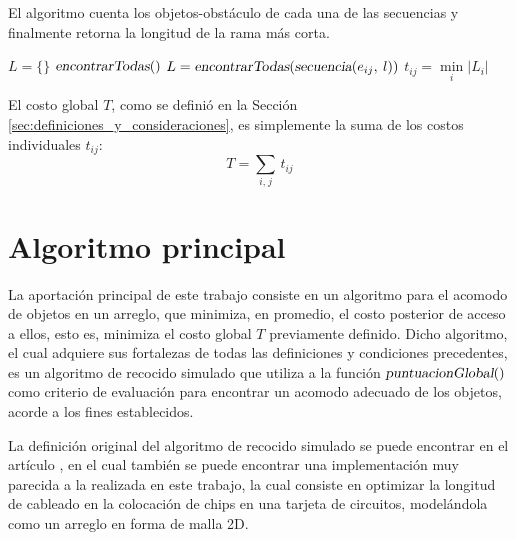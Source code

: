 El algoritmo cuenta los objetos-obstáculo de cada una de las secuencias y finalmente retorna la longitud de la rama más corta.
%
\begin{center}
\begin{minipage}{0.98\textwidth}
\begin{algorithm}[H]
	\caption{Algoritmo para calcular el costo $t_{ij}$.}%
	\label{alg:costo_individual}%
	\OneHalfBlankLine
	\TwoBlankLines
	$L = \{ \}$\;
	\TwoBlankLines
	$\textsl{encontrarTodas}()$\;
	\TwoBlankLines
	$L = \textsl{encontrarTodas}(\textsl{secuencia}(e_{ij},\: l))$\;
	\TwoBlankLines
	$t_{ij} = \min\limits_i \left| L_i \right|$\;
	\HalfBlankLine
\end{algorithm}
\end{minipage}
\end{center}
%
El \makeatletter\theHalgocf\makeatother costo global $T$, como se definió en la Sección \ref{sec:definiciones_y_consideraciones}, es simplemente la suma de los costos individuales $t_{ij}$:
%
\begin{equation}
T = \sum_{i,\hspace{1pt} j} \, t_{ij}
\end{equation}

\vspace{-\belowdisplayskip}%
%
%
\section{Algoritmo principal}
\label{sec:algoritmo_principal}
%
%
La aportación principal de este trabajo consiste en un algoritmo para el acomodo de objetos en un arreglo, que minimiza, en promedio, el costo posterior de acceso a ellos, esto es, minimiza el costo global $T$ previamente definido.
Dicho algoritmo, el cual adquiere sus fortalezas de todas las definiciones y condiciones precedentes, es un algoritmo de recocido simulado que utiliza a la función $\textsl{puntuacionGlobal}()$ como criterio de evaluación para encontrar un acomodo adecuado de los objetos, acorde a los fines establecidos.

La definición original del algoritmo de recocido simulado se puede encontrar en el artículo \cite{doi:10.1126/science.220.4598.671}, en el cual también se puede encontrar una implementación muy parecida a la realizada en este trabajo, la cual consiste en optimizar la longitud de cableado en la colocación de chips en una tarjeta de circuitos, modelándola como un arreglo en forma de malla 2D.

